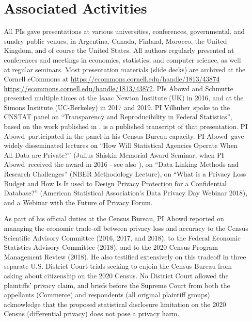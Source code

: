 \documentclass[12pt]{article}
\newcommand{\TheLars}{PI Vilhuber~}
\newcommand{\TheJohn}{PI Abowd~}
\begin{document}
\section{Associated Activities} %
\label{sec:other_activities}
All PIs  gave presentations at various universities, conferences, governmental,  and sundry public venues, in Argentina, Canada, Finland, Morocco, the United Kingdom, and of course the United States. All authors regularly presented at conferences and meetings in economics, statistics, and computer science, as well at regular seminars. Most presentation materials (slide decks) are archived at the Cornell eCommons at  \url{https://ecommons.cornell.edu/handle/1813/43874} \url{https://ecommons.cornell.edu/handle/1813/43872}. PIs Abowd and Schmutte presented multiple times at the Isaac Newton Institute (UK) in 2016, and at the Simons Institute (UC-Berkeley) in 2017 and 2019.  \TheLars spoke to the CNSTAT panel on ``Transparency and Reproducibility in Federal Statistics'', based on the work published in \textcite{chance:2017}. \textcite{NAP25305} is a published transcript of that presentation. \TheJohn participated in the panel in his Census Bureau capacity. \TheJohn gave widely disseminated lectures on ``How Will Statistical Agencies Operate When All Data are Private?'' (Julius Shiskin Memorial Award Seminar, when \TheJohn received the award in 2016 - see also \textcite{Abowd:JPC:2017}), on ``Data Linking Methods and Research Challenges'' (NBER Methodology Lecture), on ``What is a Privacy Loss Budget and How Is It used to Design Privacy Protection for a Confidential Database?'' (American Statistical Association's Data Privacy Day Webinar 2018), and a Webinar with the Future of Privacy Forum. 

As part of his official duties at the Census Bureau, PI Abowd reported on managing the economic trade-off between privacy loss and accuracy to the Census Scientific Advisory Committee (2016, 2017, and 2018), to the Federal Economic Statistics Advisory Committee (2018), and to the 2020 Census Program Management Review (2018). He also testified extensively on this tradeoff in three separate U.S. District Court trials seeking to enjoin the Census Bureau from asking about citizenship on the 2020 Census. No District Court allowed the plaintiffs’ privacy claim, and briefs before the Supreme Court from both the appellants (Commerce) and respondents (all original plaintiff groups) acknowledge that the proposed statistical disclosure limitation on the 2020 Census (differential privacy) does not pose a privacy harm.
\end{document}
